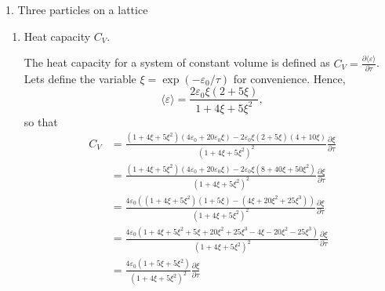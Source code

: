 \documentclass[11pt]{article}
\begin{document}
\begin{problem}{1. Three particles on a lattice}
\begin{enumerate}[label=(\alph*)]
\begin{answer}
          \begin{equation}
          \label{eq:3}
          \begin{aligned}
            \langle\varepsilon\rangle &= \frac{4\varepsilon_0\exp(-\varepsilon_0/\tau) + 10\varepsilon_0\exp(-2\varepsilon_0/\tau)}{1 + 4\exp(-\varepsilon_0/\tau) + 5\exp(-2\varepsilon_0/\tau)} \\[1.5ex]
            &= \frac{2\varepsilon_{0}\exp(-\varepsilon_{0}/\tau) \left( 2 + 5\exp(-\varepsilon_0/\tau) \right)}{1 + 4\exp(-\varepsilon_0/\tau) + 5\exp(-2\varepsilon_0/\tau)}.
          \end{aligned}
          \end{equation}
        \end{answer}
        \item Heat capacity \( C_V \).
        \begin{answer}
          The heat capacity for a system of constant volume is defined as \( C_V = \frac{\partial \langle\varepsilon\rangle}{\partial \tau}  \).
          Lets define the variable \( \xi = \exp(-\varepsilon_0/\tau) \) for convenience.
          Hence,
          \begin{equation}
          \label{eq:1exen}
            \langle\varepsilon\rangle = \frac{2\varepsilon_0\xi (2 + 5\xi)}{1 + 4\xi + 5\xi^2},
          \end{equation}
          so that
          \begin{equation}
          \label{eq:5}
          \begin{aligned}
            C_V &= \frac{(1 + 4\xi + 5\xi^2)(4\varepsilon_0 + 20\varepsilon_0\xi) - 2\varepsilon_0\xi(2+5\xi)(4+10\xi)}{(1+4\xi + 5\xi^2)^2} \frac{\partial \xi}{\partial \tau} \\[1.5ex]
                &= \frac{(1+4\xi + 5\xi^2)(4\varepsilon_0 + 20\varepsilon_0\xi) - 2\varepsilon_0\xi(8 + 40\xi + 50\xi^2)}{(1+4\xi + 5\xi^2)^2} \frac{\partial \xi}{\partial \tau} \\[1.5ex]
                &= \frac{4\varepsilon_{0} \left( (1 + 4\xi + 5\xi^2)(1 + 5\xi) - (4\xi + 20\xi^2 + 25\xi^3) \right)}{(1+4\xi + 5 \xi^2)^2} \frac{\partial \xi}{\partial \tau} \\[1.5ex]
                &= \frac{4\varepsilon_0(1 + 4\xi + 5\xi^2 + 5\xi + 20\xi^2 + 25\xi^3 - 4\xi - 20\xi^2  -25 \xi^3)}{(1 + 4 \xi + 5\xi^2)^2} \frac{\partial \xi}{\partial \tau} \\[1.5ex]
                &= \frac{4\varepsilon_{0}(1 + 5\xi + 5\xi^2)}{(1+4\xi + 5\xi^2)^2} \frac{\partial \xi}{\partial \tau} \\[1.5ex]

\end{aligned}
\end{equation}
\end{answer}
\end{enumerate}
\end{problem}
\end{document}
